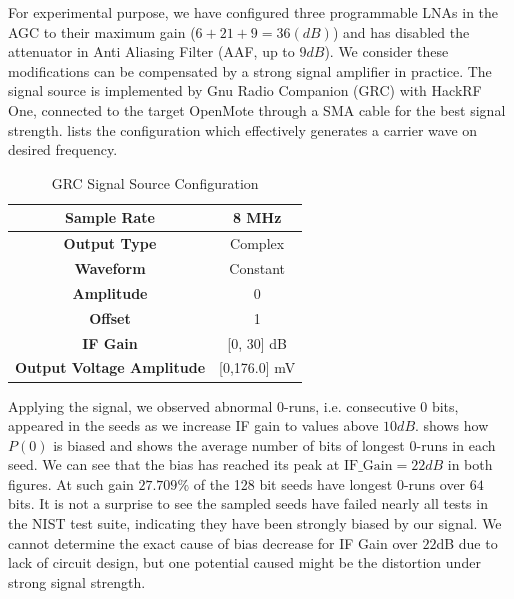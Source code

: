 For experimental purpose, we have configured three programmable LNAs in the AGC to their maximum gain ($6 + 21 + 9 = 36(dB)$) and has disabled the attenuator in Anti Aliasing Filter (AAF, up to $9dB$). We consider these modifications can be compensated by a strong signal amplifier in practice. The signal source is implemented by Gnu Radio Companion (GRC)\cite{GRC} with HackRF One\cite{HackRFOne}, connected to the target OpenMote through a SMA cable for the best signal strength.  lists the configuration which effectively generates a carrier wave on desired frequency.

\begin{table}[!t]
\caption{GRC Signal Source Configuration}
\label{ConstantSignal}
\centering
\begin{tabular}{|c|c|}
\hline
\textbf{Sample Rate} & 8 MHz             \\ \hline
\textbf{Output Type} & Complex           \\ \hline
\textbf{Waveform}    & Constant \\ \hline
\textbf{Amplitude}   & 0                 \\ \hline
\textbf{Offset}      & 1                \\ \hline
\textbf{IF Gain}      & [0, 30] dB               \\ \hline
\textbf{Output Voltage Amplitude} & [0,176.0] mV \\ \hline
\end{tabular}
\end{table}

Applying the signal, we observed abnormal 0-runs, i.e. consecutive $0$ bits, appeared in the seeds as we increase IF gain to values above $10dB$.  shows how $P(0)$ is biased and  shows the average number of bits of longest 0-runs in each seed. We can see that the bias has reached its peak at $\text{IF\_Gain} = 22dB$ in both figures. At such gain $27.709\%$ of the 128 bit seeds have longest 0-runs over $64$ bits. It is not a surprise to see the sampled seeds have failed nearly all tests in the NIST test suite, indicating they have been strongly biased by our signal. We cannot determine the exact cause of bias decrease for IF Gain over $22$dB due to lack of circuit design, but one potential caused might be the distortion under strong signal strength.

